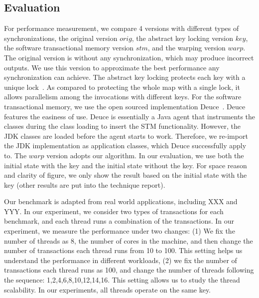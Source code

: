 \subsection{Evaluation}

For performance measurement, we compare 4 versions with different types of synchronizations, the original version $orig$, the abstract key locking version $key$, the software transactional memory version $stm$, and the warping version $warp$.  The original version is without any synchronization, which may produce incorrect outputs. 
We use this version to approximate the best performance any synchronization can achieve. The abstract key locking protects each key with a unique lock~\cite{}. As compared to protecting the whole map with a single lock, it allows parallelism among the invocations with different keys. For the software transactional memory, we use the open sourced implementation {\sf Deuce}~\cite{}. {\sf Deuce} features the easiness of use. {\sf Deuce} is essentially a Java agent that instruments the classes during the class loading to insert the STM functionality. However, the JDK classes are loaded before the agent starts to work. Therefore, we re-import the JDK implementation as application classes, which {\sf Deuce} successfully apply to. 
The $warp$ version adopts our algorithm. In our evaluation, we use both the initial state with the key and the initial state without the key.  For space reason and clarity of figure, we only show the result based on the initial state with the key (other results are put into the technique report).


Our benchmark is adapted from real world applications, including XXX and YYY. In our experiment, we consider two types of transactions for each benchmark, and each thread runs a combination of the transactions. In our experiment, we measure the performance under two changes: (1) We fix the number of threads as 8, the number of cores in the machine, and then change the number of transactions each thread runs from 10 to 100. This setting helps us understand the performance in different workloads, (2) we fix the number of transactions each thread runs as 100, and change the number of threads following the sequence: 1,2,4,6,8,10,12,14,16. This setting allows us to study the thread scalability. In our experiments, all threads operate on the same key.




